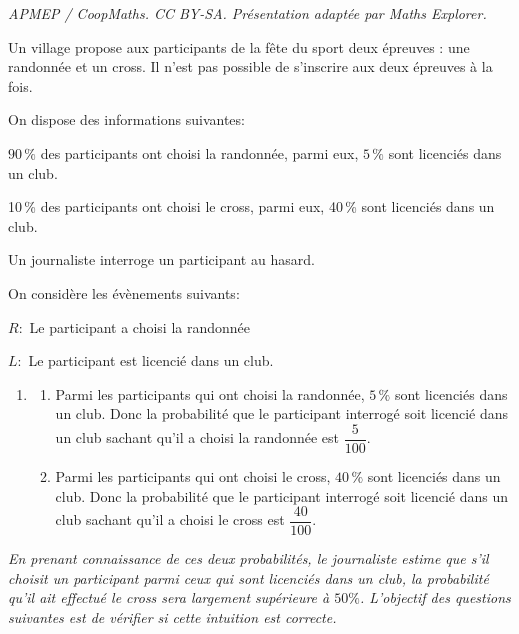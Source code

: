 \documentclass[10pt]{article}
\begin{document}
\noindent\textit{APMEP / CoopMaths. CC BY-SA. Présentation adaptée par Maths Explorer.}\par\medskip
\medskip

Un village propose aux participants de la fête du sport deux épreuves : une randonnée et un cross. Il n'est pas possible de s'inscrire aux deux épreuves à la fois.

\begin{list}{\textbullet}{On dispose des informations suivantes:}
\item $90\,\%$ des participants ont choisi la randonnée, parmi eux, $5\,\%$ sont licenciés dans un club.
\item 10\,\% des participants ont choisi le cross, parmi eux, 40\,\% sont licenciés dans un club.
\end{list}

Un journaliste interroge un participant au hasard.

\begin{list}{\textbullet}{On considère les évènements suivants:}
\item $R:$ \og  Le participant a choisi la randonnée \fg{}
\item $L:$ \og Le participant est licencié dans un club\fg{}.
\end{list}

\begin{enumerate}
\item 
	\begin{enumerate}
		\item 
Parmi les participants qui ont choisi la randonnée, $5\,\%$ sont licenciés dans un club.		
Donc la probabilité que le participant interrogé soit licencié dans un club sachant qu'il a choisi la randonnée est $\dfrac{5}{100}$.

		\item 
Parmi les participants qui ont choisi le cross, $40\,\%$ sont licenciés dans un club.		
Donc la probabilité que le participant interrogé soit licencié dans un club sachant qu'il a choisi le cross est $\dfrac{40}{100}$.
		
\end{enumerate}
\end{enumerate}

\textit{En prenant connaissance de ces deux probabilités, le journaliste estime que s'il choisit un participant parmi ceux qui sont licenciés dans un club, la probabilité qu'il ait effectué le cross sera largement supérieure à $50 \%$. L'objectif des questions suivantes est de vérifier si cette intuition est correcte.}
\end{document}
